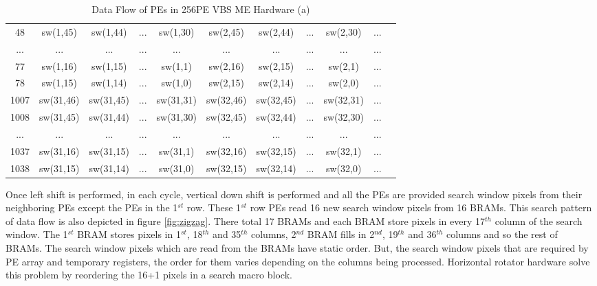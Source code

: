 \begin{table}[H]
\begin{tabular}{|c|c|c|c|c|c|c|c|c|c|c|}
		48 & sw(1,45) & sw(1,44) & ... & sw(1,30) & sw(2,45) & sw(2,44) & ... & sw(2,30) & ... \\
		
		... & ... & ... & ... & ... & ... & ... & ... & ... & ... \\
		
		77 & sw(1,16) & sw(1,15) & ... & sw(1,1) & sw(2,16) & sw(2,15) & ... & sw(2,1) & ... \\
		
		78 & sw(1,15) & sw(1,14) & ... & sw(1,0) & sw(2,15) & sw(2,14) & ... & sw(2,0) & ... \\
		
		\hline
		
		1007 & sw(31,46) & sw(31,45) & ... & sw(31,31) & sw(32,46) & sw(32,45) & ... & sw(32,31) & ... \\
		
		1008 & sw(31,45) & sw(31,44) & ... & sw(31,30) & sw(32,45) & sw(32,44) & ... & sw(32,30) & ... \\
		
		... & ... & ... & ... & ... & ... & ... & ... & ... & ... \\
		
		1037 & sw(31,16) & sw(31,15) & ... & sw(31,1) & sw(32,16) & sw(32,15) & ... & sw(32,1) & ... \\
		
		1038 & sw(31,15) & sw(31,14) & ... & sw(31,0) & sw(32,15) & sw(32,14) & ... & sw(32,0) & ... \\
		
		\hline
	\end{tabular}
	\caption{ Data Flow of PEs in 256PE VBS ME Hardware (a)}
	\label{tab:dataflow1}
\end{table}

Once left shift is performed, in each cycle, vertical down shift is performed and all the PEs are provided search window pixels from their neighboring PEs except the PEs in the 1$^{st}$ row.  These 1$^{st}$ row PEs read 16 new search window pixels from 16 BRAMs. This search pattern of data flow is also depicted in figure \ref{fig:zigzag}. There total 17 BRAMs and each BRAM store pixels in every 17$^{th}$ column of the search window. The 1$^{st}$ BRAM stores pixels in 1$^{st}$, 18$^{th}$ and 35$^{th}$ columns, 2$^{nd}$ BRAM fills in 2$^{nd}$, 19$^{th}$ and 36$^{th}$ columns and so the rest of BRAMs. The search window pixels which are read from the BRAMs have static order. But, the search window pixels that are required by PE array and temporary registers, the order for them varies depending on the columns being processed. Horizontal rotator hardware solve this problem by reordering the 16+1 pixels in a search macro block.

